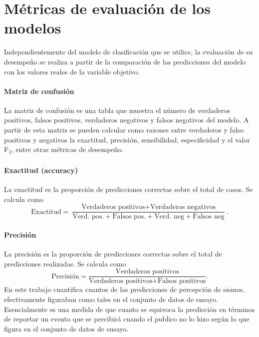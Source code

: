 \documentclass[a4paper]{report}
\begin{document}


\section{Métricas de evaluación de los modelos}\label{sec:métricas}

Independientemente del modelo de clasificación que se utilice, la evaluación de su desempeño se realiza a partir de la comparación de las predicciones del modelo con los valores reales de la variable objetivo.


\paragraph{Matriz de confusión}
La matriz de confusión es una tabla que muestra el número de verdaderos positivos, falsos positivos, verdaderos negativos y falsos negativos del modelo.
A partir de esta matriz se pueden calcular como razones entre verdaderos y falso positivos y negativos la exactitud, precisión, sensibilidad, especificidad y el valor F\textsubscript{1}, entre otras métricas de desempeño.


\paragraph{Exactitud (accuracy)}
La exactitud es la proporción de predicciones correctas sobre el total de casos.
Se calcula como
\begin{equation}
	\text{Exactitud} = \frac{\text{Verdaderos positivos} + \text{Verdaderos negativos}}{\text{Verd. pos.} + \text{Falsos pos.} + \text{Verd. neg} + \text{Falsos neg}}.
\end{equation}


\paragraph{Precisión}
La precisión es la proporción de predicciones correctas sobre el total de predicciones realizadas.
Se calcula como
\begin{equation}
	\text{Precisión} = \frac{\text{Verdaderos positivos}}{\text{Verdaderos positivos} + \text{Falsos positivos}}.
\end{equation}
En este trabajo cuantifica cuantos de las predicciones de percepción de sismos, efectivamente figuraban como tales en el conjunto de datos de ensayo.
Esencialmente es una medida de que cuanto se equivoca la predicción en términos de reportar un evento que se percibirá cuando el publico no lo hizo según lo que figura en el conjunto de datos de ensayo.
\end{document}
